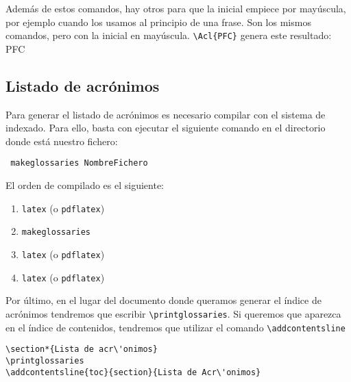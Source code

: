 \documentclass[11pt]{article}
\begin{document}
Adem\'as de estos comandos, hay otros para que la inicial empiece por
may\'uscula, por ejemplo cuando los usamos al principio de una frase. Son los
mismos comandos, pero con la inicial en may\'uscula. \verb+\Acl{PFC}+ genera
este resultado: \Acl{PFC}

\subsection{Listado de acr\'onimos}

Para generar el listado de acr\'onimos es necesario compilar con el sistema de
indexado. Para ello, basta con ejecutar el siguiente comando en el directorio
donde est\'a nuestro fichero:

\begin{lstlisting}
 makeglossaries NombreFichero
\end{lstlisting}

El orden de compilado es el siguiente:
\begin{enumerate}
 \item \texttt{latex} (o \texttt{pdflatex})
 \item \texttt{makeglossaries}
 \item \texttt{latex} (o \texttt{pdflatex})
 \item \texttt{latex} (o \texttt{pdflatex})
\end{enumerate}

Por \'ultimo, en el lugar del documento donde queramos generar el \'indice de
acr\'onimos tendremos que escribir \verb+\printglossaries+. Si queremos que
aparezca en el \'indice de contenidos, tendremos que utilizar el comando
\verb+\addcontentsline+

\begin{lstlisting}
\section*{Lista de acr\'onimos}
\printglossaries
\addcontentsline{toc}{section}{Lista de Acr\'onimos}
\end{lstlisting}




\newpage
\end{document}
